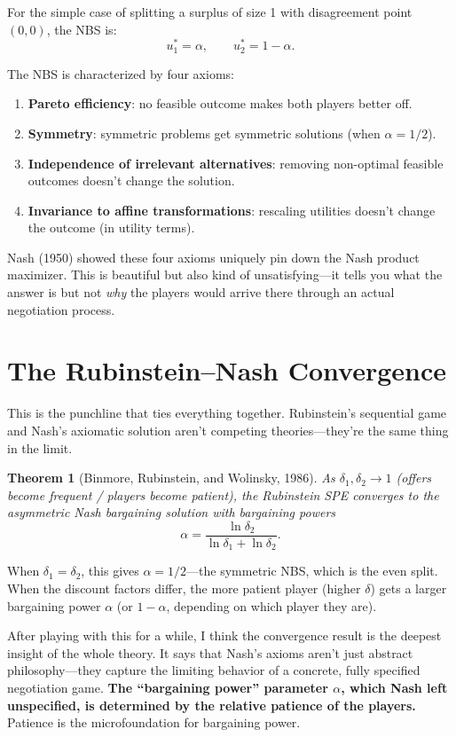 \documentclass[11pt]{article}
\newtheorem{theorem}{Theorem}
\begin{document}
For the simple case of splitting a surplus of size 1 with disagreement point $(0, 0)$, the NBS is:
\[
u_1^* = \alpha, \qquad u_2^* = 1 - \alpha.
\]

The NBS is characterized by four axioms:
\begin{enumerate}
\item \textbf{Pareto efficiency}: no feasible outcome makes both players better off.
\item \textbf{Symmetry}: symmetric problems get symmetric solutions (when $\alpha = 1/2$).
\item \textbf{Independence of irrelevant alternatives}: removing non-optimal feasible outcomes doesn't change the solution.
\item \textbf{Invariance to affine transformations}: rescaling utilities doesn't change the outcome (in utility terms).
\end{enumerate}

Nash (1950) showed these four axioms uniquely pin down the Nash product maximizer. This is beautiful but also kind of unsatisfying---it tells you what the answer is but not \emph{why} the players would arrive there through an actual negotiation process.

\section{The Rubinstein--Nash Convergence}

This is the punchline that ties everything together. Rubinstein's sequential game and Nash's axiomatic solution aren't competing theories---they're the same thing in the limit.

\begin{theorem}[Binmore, Rubinstein, and Wolinsky, 1986]
As $\delta_1, \delta_2 \to 1$ (offers become frequent / players become patient), the Rubinstein SPE converges to the asymmetric Nash bargaining solution with bargaining powers
\[
\alpha = \frac{\ln \delta_2}{\ln \delta_1 + \ln \delta_2}.
\]
\end{theorem}

When $\delta_1 = \delta_2$, this gives $\alpha = 1/2$---the symmetric NBS, which is the even split. When the discount factors differ, the more patient player (higher $\delta$) gets a larger bargaining power $\alpha$ (or $1-\alpha$, depending on which player they are).

After playing with this for a while, I think the convergence result is the deepest insight of the whole theory. It says that Nash's axioms aren't just abstract philosophy---they capture the limiting behavior of a concrete, fully specified negotiation game. \textbf{The ``bargaining power'' parameter $\alpha$, which Nash left unspecified, is determined by the relative patience of the players.} Patience is the microfoundation for bargaining power.
\end{document}
